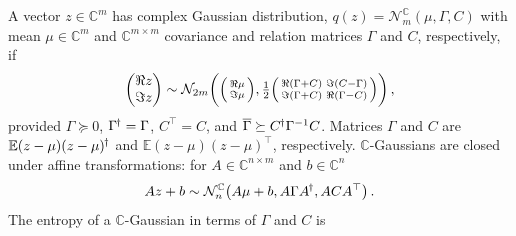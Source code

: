 \documentclass[a4paper,10pt]{article}
\newcommand{\cplx}{\mathbb{C}}
\newcommand{\hop}{{\mkern-1.5mu\dagger}}
\newcommand{\conj}[1]{\overline{#1}}
\begin{document}
A vector $z\in \cplx^m$ has complex Gaussian distribution, $
  q(z) = \mathcal{N}^{\cplx}_m(\mu, \Gamma, C)
$ with mean $\mu \in \cplx^m$ and $\cplx^{m\times m}$ covariance and relation matrices
$\Gamma$ and $C$, respectively, if
\begin{equation}  \label{eq:cn-paired-real-density}
  \begin{pmatrix}
    \Re z \\ \Im z
  \end{pmatrix}
    \sim \mathcal{N}_{2 m}\biggl(
      \Bigl(
        \begin{smallmatrix}
          \Re \mu \\ \Im \mu
        \end{smallmatrix}
      \Bigr),
      \tfrac12 \Bigl(
        \begin{smallmatrix}
          \Re{(\Gamma + C)} & \Im{(C - \Gamma)} \\
          \Im{(\Gamma + C)} & \Re{(\Gamma - C)}
        \end{smallmatrix}
      \Bigr)
    \biggr)
    \,,
\end{equation}
provided $\Gamma \succeq 0$, $\Gamma^{\hop} = \Gamma$, $C^\top = C$, and $
  \conj{\Gamma} \succeq C^{\hop} \Gamma^{-1} C
$. Matrices $\Gamma$ and $C$ are $
  \mathbb{E} (z - \mu)(z - \mu)^{\hop}
$ and $
  \mathbb{E} (z - \mu)(z - \mu)^{\top}
$, respectively.
%
%
$\cplx$-Gaussians are closed under affine transformations: for $A \in \cplx^{n \times m}$
and $b \in \cplx^{n}$
\begin{equation}  \label{eq:cn-affine}
  A z + b \sim \mathcal{N}_n^{\cplx}\bigl(
      A\mu + b, A \Gamma A^{\hop}, A C A^\top
    \bigr)
  \,.
\end{equation}
%
The entropy of a $\cplx$-Gaussian in terms of $\Gamma$ and $C$ is
\end{document}
